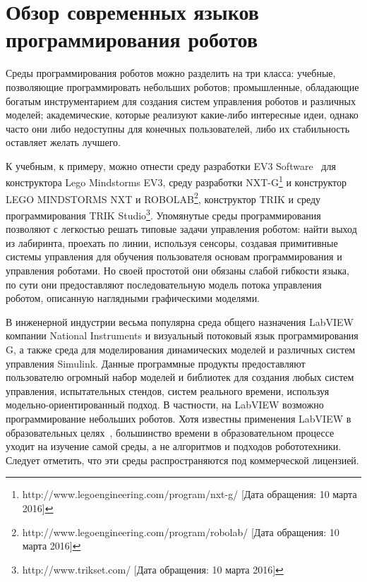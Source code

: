 \documentclass[conference]{IEEEtran}
\begin{document}
\section{Обзор современных языков программирования роботов}
\label{sec:Overview}
Среды программирования роботов можно разделить на три класса: учебные, позволяющие программировать небольших роботов; промышленные, обладающие богатым инструментарием для создания систем управления роботов и различных моделей; академические, которые реализуют какие-либо интересные идеи, однако часто они либо недоступны для конечных пользователей, либо их стабильность оставляет желать лучшего. 

К учебным, к примеру, можно отнести среду разработки EV3 Software~\cite{3_rollins} для конструктора Lego Mindstorms EV3, среду разработки NXT-G\footnote{http://www.legoengineering.com/program/nxt-g/ [Дата обращения: 10 марта 2016]} и конструктор LEGO MINDSTORMS NXT и ROBOLAB\footnote{http://www.legoengineering.com/program/robolab/ [Дата обращения: 10 марта 2016]}, конструктор TRIK и среду программирования TRIK Studio\footnote{http://www.trikset.com/ [Дата обращения: 10 марта 2016]}. Упомянутые среды программирования позволяют с легкостью решать типовые задачи управления роботом: найти выход из лабиринта, проехать по линии, используя сенсоры, создавая примитивные системы управления для обучения пользователя основам программирования и управления роботами. Но своей простотой они обязаны слабой гибкости языка, по сути они предоставляют последовательную модель потока управления роботом, описанную наглядными графическими моделями.

В инженерной индустрии весьма популярна среда общего назначения LabVIEW компании National Instruments и визуальный потоковый язык программирования G, а также среда для моделирования динамических моделей и различных систем управления Simulink. Данные программные продукты предоставляют пользователю огромный набор моделей и библиотек для создания любых систем управления, испытательных стендов, систем реального времени, используя модельно-ориентированный подход. В частности, на LabVIEW возможно программирование небольших роботов. Хотя известны применения LabVIEW в образовательных целях~\cite{1_gomez-de-gabriel_mandow_fernandez-lozano_garcia-cerezo_2011}, большинство времени в образовательном процессе уходит на изучение самой среды, а не алгоритмов и подходов робототехники. Следует отметить, что эти среды распространяются под коммерческой лицензией.
\end{document}
